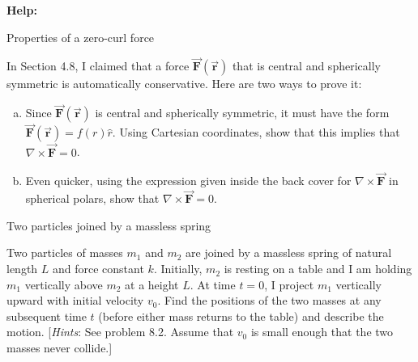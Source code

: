 \documentclass[11pt,letterpaper,boxed]{../hmcpsetrhino}
\let\oldvec\vec
\renewcommand{\vec}[1]{\oldvec{\mathbf{#1}}}
\begin{document}
\textbf{Help:} 

\begin{problem}[i]
Properties of a zero-curl force

\begin{problem}[4.43]
In Section 4.8, I claimed that a force $\vec F(\vec r)$ that is central and spherically symmetric is automatically conservative. Here are two ways to prove it:
\begin{enumerate}[(a)]
\item Since $\vec F (\vec r)$ is central and spherically symmetric, it must have the form $\vec F(\vec r) = f(r) \hat r$. Using Cartesian coordinates, show that this implies that $\nabla \times \vec F = 0$.
\item Even quicker, using the expression given inside the back cover for $\nabla \times \vec F$ in spherical polars, show that $\nabla \times \vec F = 0$.
\end{enumerate}
\end{problem}
\end{problem}
\begin{solution}


\vfill
\end{solution}

\newpage 

\begin{problem}[ii]
Two particles joined by a massless spring

\begin{problem}[8.3]
Two particles of masses $m_1$ and $m_2$ are joined by a massless spring of natural length $L$ and force constant $k$. Initially, $m_2$ is resting on a table and I am holding $m_1$ vertically above $m_2$ at a height $L$. At time $t=0$, I project $m_1$ vertically upward with initial velocity $v_0$. Find the positions of the two masses at any subsequent time $t$ (before either mass returns to the table) and describe the motion. [\textit{Hints}: See problem 8.2. Assume that $v_0$ is small enough that the two masses never collide.]
\end{problem}
\end{problem}
\begin{solution}


\vfill
\end{solution}


\newpage
\end{document}
